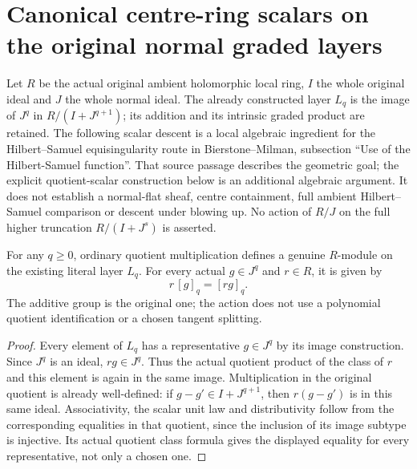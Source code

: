 \section{Canonical centre-ring scalars on the original normal graded layers}

Let $R$ be the actual original ambient holomorphic local ring, $I$ the
whole original ideal and $J$ the whole normal ideal.  The already constructed
layer $L_q$ is the image of $J^q$ in $R/(I+J^{q+1})$; its addition and its
intrinsic graded product are retained.  The following scalar descent is a
local algebraic ingredient for the Hilbert--Samuel equisingularity route in
Bierstone--Milman, subsection ``Use of the Hilbert-Samuel
function''.  That source passage describes the geometric goal; the explicit
quotient-scalar construction below is an additional algebraic argument.
It does not establish a normal-flat sheaf, centre containment, full ambient
Hilbert--Samuel comparison or descent under blowing up.  No action of $R/J$
on the full higher truncation $R/(I+J^s)$ is asserted.

\begin{lemma}
\label{hir:relative-normal-actual-layer-ambient-scalars}
\leanok
For any $q\geq0$, ordinary quotient multiplication defines a genuine
$R$-module on the existing literal layer $L_q$.  For every actual
$g\in J^q$ and $r\in R$, it is given by
\[
 r\,[g]_q=[rg]_q.
\]
The additive group is the original one; the action does not use a
polynomial quotient identification or a chosen tangent splitting.
\end{lemma}
\begin{proof}
Every element of $L_q$ has a representative $g\in J^q$ by its image
construction.  Since $J^q$ is an ideal, $rg\in J^q$.  Thus the actual
quotient product of the class of $r$ and this element is again in the
same image.  Multiplication in the original quotient is already
well-defined: if $g-g'\in I+J^{q+1}$, then $r(g-g')$ is in this same ideal.
Associativity, the scalar unit law and distributivity follow from the
corresponding equalities in that quotient, since the inclusion of its
image subtype is injective.  Its actual quotient class formula gives
the displayed equality for every representative, not only a chosen one.
\end{proof}

